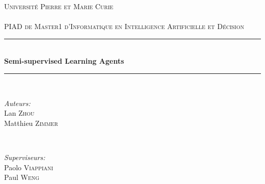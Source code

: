 \begin{titlepage}

\newcommand{\HRule}{\rule{\linewidth}{0.5mm}} %

\center %
 

\textsc{\LARGE Université Pierre et Marie Curie}\\[1.5cm] %
\textsc{\Large \titletype}\\[0.5cm] %
\textsc{\large PIAD de Master1 d’Informatique en Intelligence Artificielle et Décision}\\[0.5cm] %


\HRule \\[0.4cm]
{ \huge \bfseries Semi-supervised Learning Agents}\\[0.4cm] %
\HRule \\[1.5cm]
 
 
 
 

\begin{minipage}{0.4\textwidth}
\begin{flushleft} \large
\emph{Auteurs:}\\
Lan \textsc{Zhou}\\ %
Matthieu \textsc{Zimmer} %
\end{flushleft}
\end{minipage}
~
\begin{minipage}{0.4\textwidth}
\begin{flushright} \large
\emph{Superviseurs:} \\
Paolo \textsc{Viappiani}\\ %
Paul \textsc{Weng}\\ %
\end{flushright}
\end{minipage}\\[1cm]


\end{titlepage}
